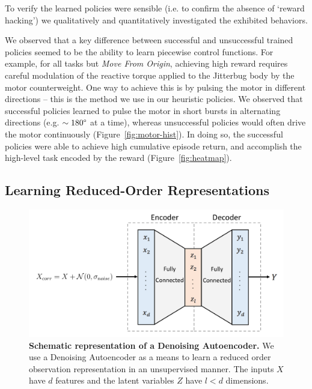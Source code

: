 \documentclass{article}
\begin{document}
To verify the learned policies were sensible (i.e. to confirm the absence of `reward hacking') we qualitatively and quantitatively investigated the exhibited behaviors.

We observed that a key difference between successful and unsuccessful trained policies seemed to be the ability to learn piecewise control functions.
For example, for all tasks but \emph{Move From Origin}, achieving high reward requires careful modulation of the reactive torque applied to the Jitterbug body by the motor counterweight.
One way to achieve this is by pulsing the motor in different directions -- this is the method we use in our heuristic policies.
We observed that successful policies learned to pulse the motor in short bursts in alternating directions (e.g. $\sim180\degree$ at a time), whereas unsuccessful policies would often drive the motor continuously (Figure~\ref{fig:motor-hist}).
In doing so, the successful policies were able to achieve high cumulative episode return, and accomplish the high-level task encoded by the reward (Figure~\ref{fig:heatmap}).

\subsection{Learning Reduced-Order Representations}\label{sec:lro}

\begin{figure}[t]
    \centering
    \includegraphics[width=0.8\linewidth]{fig-autoencoder}\vspace*{-12pt}
    \caption{
        \textbf{Schematic representation of a Denoising Autoencoder.}
        We use a Denoising Autoencoder as a means to learn a reduced order observation representation in an unsupervised manner.
        The inputs $X$ have $d$ features and the latent variables $Z$ have $l<d$ dimensions.
    }\vspace*{-12pt}
    \label{fig:autoencoder}
\end{figure}
\end{document}
